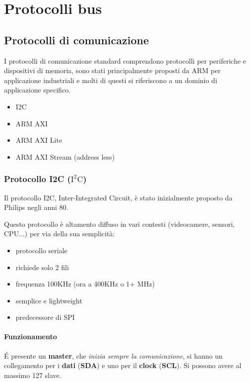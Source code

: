 \chapter{Protocolli bus}

\section{Protocolli di comunicazione}
I protocolli di comunicazione standard comprendono protocolli per periferiche e dispositivi di memoria, sono stati principalmente proposti da ARM per applicazione industriali e molti di questi si riferiscono a un dominio di applicazione specifico.

\begin{itemize}
    \item I2C
    \item ARM AXI
    \item ARM AXI Lite
    \item ARM AXI Stream (address less)
\end{itemize}

\subsection{Protocollo I2C ($\text{I}^2\text{C}$)}

Il protocollo I2C, Inter-Integrated Circuit, è stato inizialmente proposto da Philips negli anni 80.

Questo protocollo è altamento diffuso in vari contesti (videocamere, sensori, CPU...) per via della sua semplicità:
\begin{itemize}
    \item protocollo seriale
    \item richiede solo 2 fili
    \item frequenza 100KHz (ora a 400KHz o 1+ MHz)
    \item semplice e lightweight
    \item predecessore di SPI
\end{itemize}

\subsubsection{Funzionamento}
É presente un \textbf{master}, che \textit{inizia sempre la comunicazione}, si hanno un collegamento per i \textbf{dati} (\textbf{SDA}) e uno per il \textbf{clock} (\textbf{SCL}). Si possono avere al massimo 127 slave.


